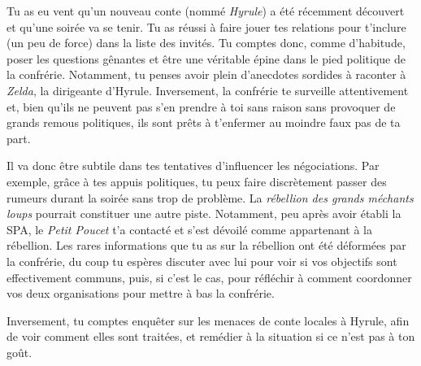 {	\par Tu as eu vent qu'un nouveau conte (nommé \emph{Hyrule}) a été récemment découvert et qu'une soirée va se tenir. Tu as réussi à faire jouer tes relations pour t'inclure (un peu de force) dans la liste des invités. Tu comptes donc, comme d'habitude, poser les questions gênantes et être une véritable épine dans le pied politique de la confrérie. Notamment, tu penses avoir plein d'anecdotes sordides à raconter à \emph{Zelda}, la dirigeante d'Hyrule. Inversement, la confrérie te surveille attentivement et, bien qu'ils ne peuvent pas s'en prendre à toi sans raison sans provoquer de grands remous politiques, ils sont prêts à t'enfermer au moindre faux pas de ta part.
	
	\par Il va donc être subtile dans tes tentatives d'influencer les négociations. Par exemple, grâce à tes appuis politiques, tu peux faire discrètement passer des rumeurs durant la soirée sans trop de problème. La \emph{rébellion des grands méchants loups} pourrait constituer une autre piste. Notamment, peu après avoir établi la SPA, le \emph{Petit Poucet} t'a contacté et s'est dévoilé comme appartenant à la rébellion. Les rares informations que tu as sur la rébellion ont été déformées par la confrérie, du coup tu espères discuter avec lui pour voir si vos objectifs sont effectivement communs, puis, si c'est le cas, pour réfléchir à comment coordonner vos deux organisations pour mettre à bas la confrérie.
	
	\par Inversement, tu comptes enquêter sur les menaces de conte locales à Hyrule, afin de voir comment elles sont traitées, et remédier à la situation si ce n'est pas à ton goût.
}







